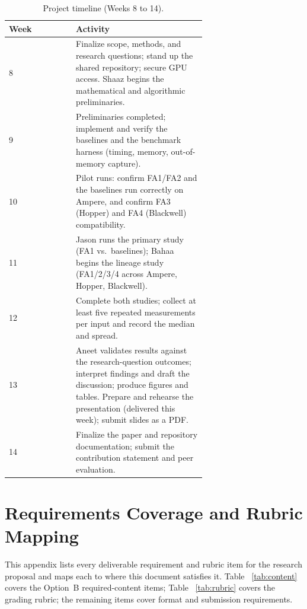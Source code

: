 \documentclass[sigconf,nonacm]{acmart}
\begin{document}
\begin{table}[h]
  \centering
  \caption{Project timeline (Weeks 8 to 14).}
  \label{tab:timeline}
  \small
  \begin{tabular}{@{}lp{0.66\linewidth}@{}}
    \toprule
    \textbf{Week} & \textbf{Activity} \\
    \midrule
    8 & Finalize scope, methods, and research questions; stand up the shared
      repository; secure GPU access. Shaaz begins the mathematical and
      algorithmic preliminaries. \\
    9 & Preliminaries completed; implement and verify the baselines and the
      benchmark harness (timing, memory, out-of-memory capture). \\
    10 & Pilot runs: confirm FA1/FA2 and the baselines run correctly on Ampere,
      and confirm FA3 (Hopper) and FA4 (Blackwell) compatibility. \\
    11 & Jason runs the primary study (FA1 vs.\ baselines); Bahaa begins the
      lineage study (FA1/2/3/4 across Ampere, Hopper, Blackwell). \\
    12 & Complete both studies; collect at least five repeated measurements per
      input and record the median and spread. \\
    13 & Aneet validates results against the research-question outcomes;
      interpret findings and draft the discussion; produce figures and tables.
      Prepare and rehearse the presentation (delivered this week); submit slides
      as a PDF. \\
    14 & Finalize the paper and repository documentation; submit the contribution
      statement and peer evaluation. \\
    \bottomrule
  \end{tabular}
\end{table}




\clearpage
\appendix

\section{Requirements Coverage and Rubric Mapping}
\label{app:coverage}
This appendix lists every deliverable requirement and rubric item for the
research proposal and maps each to where this document satisfies it. Table~
\ref{tab:content} covers the Option~B required-content items; Table~
\ref{tab:rubric} covers the grading rubric; the remaining items cover format and
submission requirements.
\end{document}
